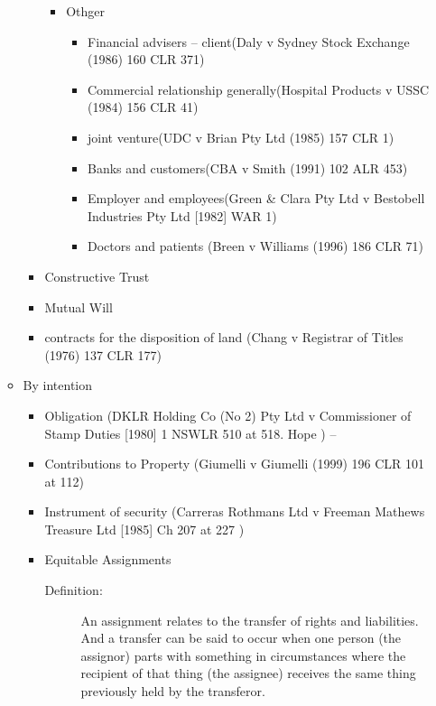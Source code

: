 \begin{itemize}
\begin{itemize}
\begin{itemize}
\begin{itemize}
                            \item Othger
                                \begin{itemize}
                                    \item Financial advisers -- client(Daly v Sydney Stock Exchange (1986) 160 CLR 371)
                                    \item Commercial relationship generally(Hospital Products v USSC (1984) 156 CLR 41)
                                    \item joint venture(UDC v Brian Pty Ltd (1985) 157 CLR 1)
                                    \item Banks and customers(CBA v Smith (1991) 102 ALR 453)
                                    \item Employer and employees(Green & Clara Pty Ltd v Bestobell Industries Pty Ltd [1982] WAR 1)
                                    \item Doctors and patients (Breen v Williams (1996) 186 CLR 71)
                                \end{itemize}
                        \end{itemize}
                    \item Constructive Trust
                    \item Mutual Will
                    \item contracts for the disposition of land (Chang v Registrar of Titles (1976) 137 CLR 177)
                \end{itemize}
            \item By intention
                \begin{itemize}
                    \item Obligation (DKLR Holding Co (No 2) Pty Ltd v Commissioner of Stamp Duties [1980] 1 NSWLR 510 at 518. Hope ) -- 
                    \item Contributions to Property (Giumelli v Giumelli (1999) 196 CLR 101 at 112)
                    \item Instrument of security (Carreras Rothmans Ltd v Freeman Mathews Treasure Ltd [1985] Ch 207 at 227 )
                    \item Equitable Assignments
                        \begin{description}
                            \item[Definition:]An assignment relates to the transfer of rights and liabilities. And a transfer can be said to occur when one person (the assignor) parts with something in circumstances where the recipient of that thing (the assignee) receives the same thing previously held by the transferor. 


\end{description}
\end{itemize}
\end{itemize}
\end{itemize}
